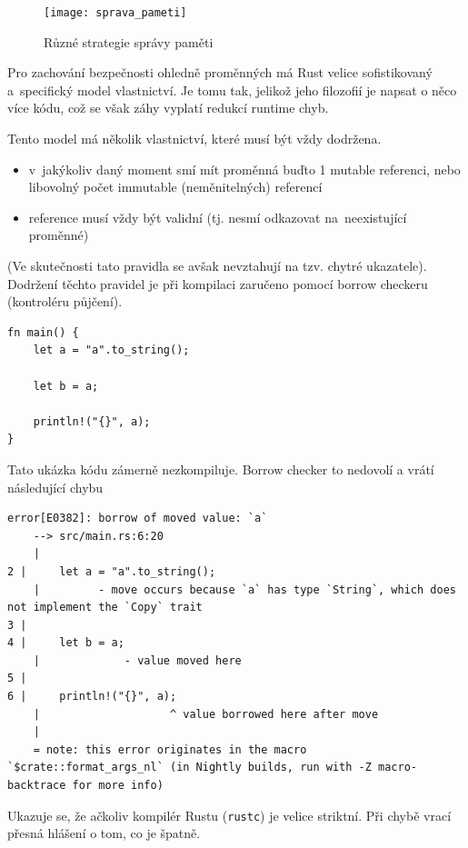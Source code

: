 \documentclass[a4paper, 12pt, twoside]{article} %
\begin{document}
			\begin{center}
				\begin{figure}[H]
					\centering
					\texttt{[image: sprava\_pameti]}
					\caption{Různé strategie správy paměti \cite{sprava_pameti}}
					\label{fig:ret_mod}
				\end{figure}
			\end{center}
		
			Pro zachování bezpečnosti ohledně proměnných má Rust velice sofistikovaný a~specifický model vlastnictví. Je tomu tak, jelikož jeho filozofií je napsat o něco více kódu, což se však záhy vyplatí redukcí runtime chyb.
	
			Tento model má několik vlastnictví, které musí být vždy dodržena.
			\begin{itemize}
				\item v~jakýkoliv daný moment smí mít proměnná buďto 1 mutable referenci, nebo libovolný počet immutable (neměnitelných) referencí
				\item reference musí vždy být validní (tj. nesmí odkazovat na~neexistující proměnné)
			\end{itemize}
			
			(Ve skutečnosti tato pravidla se avšak nevztahují na tzv. chytré ukazatele). Dodržení těchto pravidel je při kompilaci zaručeno pomocí borrow checkeru (kontroléru půjčení).
			\begin{verbatim}
fn main() {
	let a = "a".to_string();
	
	let b = a;
	
	println!("{}", a);
}
			\end{verbatim}
	
			Tato ukázka kódu zámerně nezkompiluje. Borrow checker to nedovolí a vrátí následující chybu
			\begin{verbatim}
error[E0382]: borrow of moved value: `a`
	--> src/main.rs:6:20
	|
2 |     let a = "a".to_string();
	|         - move occurs because `a` has type `String`, which does not implement the `Copy` trait
3 |     
4 |     let b = a;
	|             - value moved here
5 |     
6 |     println!("{}", a);
	|                    ^ value borrowed here after move
	|
	= note: this error originates in the macro `$crate::format_args_nl` (in Nightly builds, run with -Z macro-backtrace for more info)

				\end{verbatim}
					
				Ukazuje se, že ačkoliv kompilér Rustu (\texttt{rustc}) je velice striktní. Při chybě vrací přesná hlášení o tom, co je špatně.
				
\end{document}
